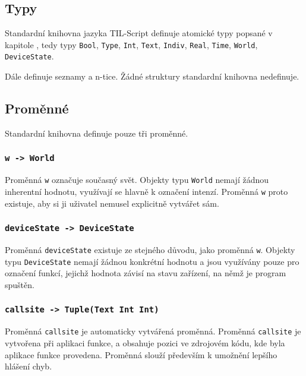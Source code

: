 
\subsection{Typy}

Standardní knihovna jazyka TIL-Script definuje atomické typy popsané v kapitole
, tedy typy
\lstinline{Bool}, \lstinline{Type}, \lstinline{Int}, \lstinline{Text}, \lstinline{Indiv},
\lstinline{Real}, \lstinline{Time}, \lstinline{World}, \lstinline{DeviceState}.

Dále definuje seznamy a n-tice. Žádné struktury standardní knihovna nedefinuje.

\subsection{Proměnné}

Standardní knihovna definuje pouze tři proměnné.

\subsubsection{\lstinline{w -> World}}

Proměnná \lstinline{w} označuje současný svět. Objekty typu \lstinline{World} nemají žádnou
inherentní hodnotu, využívají se hlavně k označení intenzí. Proměnná \lstinline{w} proto existuje,
aby si ji uživatel nemusel explicitně vytvářet sám.

\subsubsection{\lstinline{deviceState -> DeviceState}}

Proměnná \lstinline{deviceState} existuje ze stejného důvodu, jako proměnná \lstinline{w}. Objekty
typu \lstinline{DeviceState} nemají žádnou konkrétní hodnotu a jsou využívány pouze pro označení
funkcí, jejichž hodnota závisí na stavu zařízení, na němž je program spuštěn.

\subsubsection{\lstinline{callsite -> Tuple(Text Int Int)}}\label{callsite-var}

Proměnná \lstinline{callsite} je automaticky vytvářená proměnná. Proměnná \lstinline{callsite}
je vytvořena při aplikaci funkce, a obsahuje pozici ve zdrojovém kódu, kde byla aplikace funkce
provedena. Proměnná slouží především k umožnění lepšího hlášení chyb.

